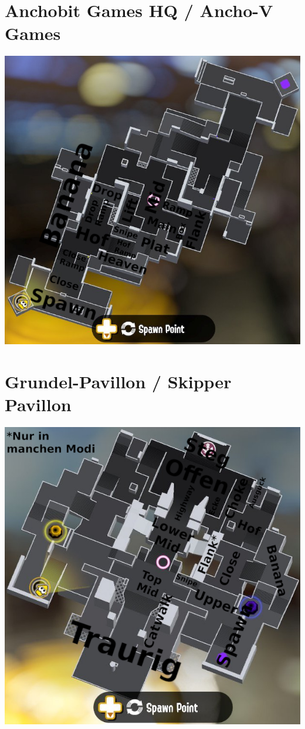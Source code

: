 \documentclass{scrreprt}
\begin{document}
\section{Anchobit Games HQ / Ancho-V Games}
\includegraphics[width=\linewidth]{img/anchovgames.png}
\section{Grundel-Pavillon / Skipper Pavillon}
\includegraphics[width=\linewidth]{img/skipperpavillon.png}
\end{document}
